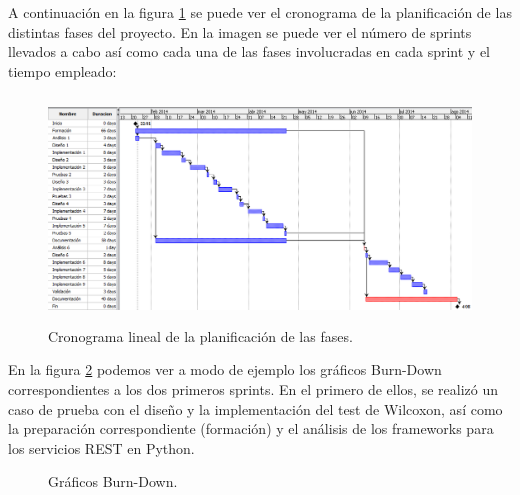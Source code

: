 A continuación en la figura \ref{fig:gantt} se puede ver el cronograma de la planificación de las distintas fases del proyecto. En la imagen se puede ver el número de sprints llevados a cabo así como cada una de las fases involucradas en cada sprint y el tiempo empleado:

\begin{figure}[H]
\centering
\includegraphics[width=13cm,height=6cm]{figuras/gantt.png}
\caption{Cronograma lineal de la planificación de las fases.}
\label{fig:gantt}
\end{figure}

En la figura \ref{fig:bd1} podemos ver a modo de ejemplo los gráficos Burn-Down correspondientes a los dos primeros sprints. En el primero de ellos, se realizó un caso de prueba con el diseño y la implementación del test de Wilcoxon, así como la preparación correspondiente (formación) y el análisis de los frameworks para los servicios REST en Python.

\begin{figure}[h]
\centering
{}
\caption{Gráficos Burn-Down.}
\label{fig:bd1}
\end{figure}

